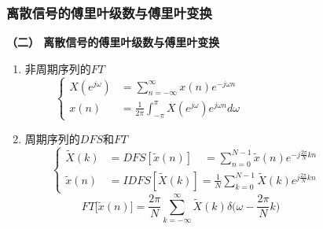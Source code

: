 \documentclass[notheorems,compress,mathserif,table]{beamer}
\begin{document}
\begin{frame}[shrink]\frametitle{离散信号的傅里叶级数与傅里叶变换}%

\textbf{（二） 离散信号的傅里叶级数与傅里叶变换}
  \begin{enumerate}
    \item 非周期序列的$FT$
    $$
    \left\{ \begin{aligned}
         X(e^{j\omega}) &=\sum_{n=-\infty}^{\infty}x(n)e^{-j\omega n} \qquad\qquad\qquad\qquad\qquad\qquad \\
          x(n)        &=\frac{1}{2\pi}\int_{-\pi}^{\pi}X(e^{j\omega})e^{j\omega n}d\omega
    \end{aligned} \right.
    $$
    \item 周期序列的$DFS$和$FT$
    \begin{equation*}
           \left\{ \begin{aligned}
               \tilde{X}(k) &= DFS[\tilde{x}(n)]\quad  =  \sum_{n=0}^{N-1}\tilde{x}(n)e^{-j\frac{2\pi}{N}kn} \qquad\qquad\quad\\
               \tilde{x}(n) &= IDFS[\tilde{X}(k)]
                               = \frac{1}{N}\sum_{k=0}^{N-1}\tilde{X}(k)e^{j\frac{2\pi}{N}kn}
           \end{aligned} \right.
    \end{equation*}\vspace{-0.3cm}
    $$FT\big[\tilde{x}(n)\big] = \frac{2\pi}{N}\sum_{k=-\infty}^{\infty}\tilde{X}(k)\delta\big(\omega-\frac{2\pi}{N}k\big) \qquad\qquad\qquad$$
  \end{enumerate}
\end{frame}
\end{document}
